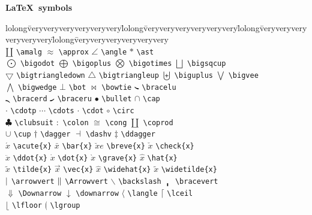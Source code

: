 \documentclass{asl}
\begin{document}
\centerline{\bf \LaTeX\ symbols}
\medskip

\begin{tabbing}
lolong\= veryveryveryveryveryvery\=
lolong\= veryveryveryveryveryvery\=
lolong\= veryveryveryveryveryvery\=
lolong\= veryveryveryveryveryvery
\kill \\
$\amalg$ \> \verb+\amalg+ \> $\approx$ \> \verb+\approx+ \>
$\angle$ \> \verb+\angle+ \> $\ast$ \> \verb+\ast+ \\
$\bigodot$ \> \verb+\bigodot+ \> $\bigoplus$ \> \verb+\bigoplus+ \>
$\bigotimes$ \> \verb+\bigotimes+ \> $\bigsqcup$ \> \verb+\bigsqcup+ \\
$\bigtriangledown$ \> \verb+\bigtriangledown+ \> $\bigtriangleup$ \> \verb+\bigtriangleup+ \>
$\biguplus$ \> \verb+\biguplus+ \> $\bigvee$ \> \verb+\bigvee+ \\
$\bigwedge$ \> \verb+\bigwedge+ \> $\bot$ \> \verb+\bot+ \>
$\bowtie$ \> \verb+\bowtie+ \> $\bracelu$ \> \verb+\bracelu+ \\
$\bracerd$ \> \verb+\bracerd+ \> $\braceru$ \> \verb+\braceru+ \>
$\bullet$ \> \verb+\bullet+ \> $\cap$ \> \verb+\cap+ \\
$\cdotp$ \> \verb+\cdotp+ \> $\cdots$ \> \verb+\cdots+ \>
$\cdot$ \> \verb+\cdot+ \> $\circ$ \> \verb+\circ+ \\
$\clubsuit$ \> \verb+\clubsuit+ \> $\colon$ \> \verb+\colon+ \>
$\cong$ \> \verb+\cong+ \> $\coprod$ \> \verb+\coprod+ \\
$\cup$ \> \verb+\cup+ \> $\dagger$ \> \verb+\dagger+ \>
$\dashv$ \> \verb+\dashv+ \> $\ddagger$ \> \verb+\ddagger+ \\
$\acute{x}$ \> \verb+\acute{x}+ \> $\bar{x}$ \> \verb+\bar{x}+ \>
$\breve{x}e$ \> \verb+\breve{x}+ \> $\check{x}$ \> \verb+\check{x}+ \\
$\ddot{x}$ \> \verb+\ddot{x}+ \> $\dot{x}$ \> \verb+\dot{x}+ \>
$\grave{x}$ \> \verb+\grave{x}+ \> $\hat{x}$ \> \verb+\hat{x}+ \\
$\tilde{x}$ \> \verb+\tilde{x}+ \> $\vec{x}$ \> \verb+\vec{x}+ \>
$\widehat{x}$ \> \verb+\widehat{x}+ \> $\widetilde{x}$ \> \verb+\widetilde{x}+ \\
$\arrowvert$ \> \verb+\arrowvert+ \> $\Arrowvert$ \> \verb+\Arrowvert+ \>
$\backslash$ \> \verb+\backslash+ \> $\bracevert$ \> \verb+\bracevert+ \\
$\Downarrow$ \> \verb+\Downarrow+ \> $\downarrow$ \> \verb+\downarrow+ \>
$\langle$ \> \verb+\langle+ \> $\lceil$ \> \verb+\lceil+ \\
$\lfloor$ \> \verb+\lfloor+ \> $\lgroup$ \> \verb+\lgroup+ \>

\end{tabbing}
\end{document}
